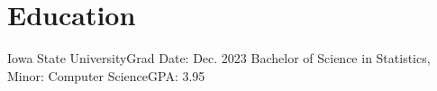 \section{Education}
  \resumeSubHeadingListStart
    \resumeSubheading
      {Iowa State University}{Grad Date: Dec. 2023}
      {Bachelor of Science in Statistics, Minor: Computer Science}{GPA: 3.95}
        \resumeItemListStart
        \resumeItemListEnd
  \resumeSubHeadingListEnd
